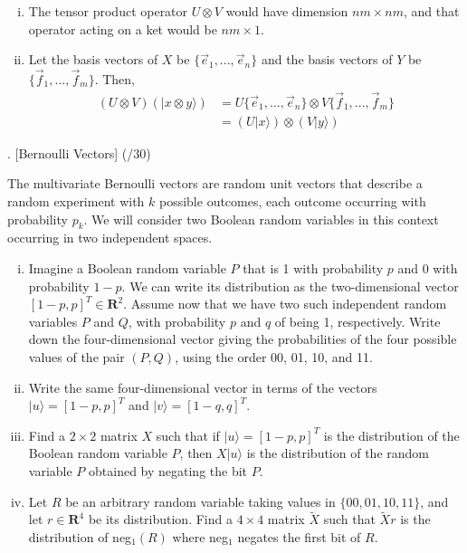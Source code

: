 \documentclass[11pt]{article}
\newenvironment{solution}{\begin{mdframed}[skipabove=\baselineskip,innertopmargin=\baselineskip,innerbottommargin=\baselineskip]
  }{\end{mdframed}}
\begin{document}
\begin{solution}
\begin{enumerate}[(i)]
    \item 
    The tensor product operator $U\otimes V$ would have dimension $nm\times nm$, and that operator acting on a ket would be $nm\times 1$.
    \item  Let the basis vectors of $X$ be $\{\overrightarrow{e}_1,...,\overrightarrow{e}_n\}$ and the basis vectors of $Y$ be $\{\overrightarrow{f}_1,...,\overrightarrow{f}_m\}$. Then, \begin{align*}
        (U\otimes V)(|x \otimes y \rangle) &= U\{\overrightarrow{e}_1,...,\overrightarrow{e}_n\} \otimes V\{\overrightarrow{f}_1,...,\overrightarrow{f}_m\}\\
        &= (U|x\rangle)\otimes(V|y\rangle)
    \end{align*}
\end{enumerate}
\end{solution}

\newpage

 . [Bernoulli Vectors] (/30)
 
The multivariate Bernoulli vectors are random unit vectors that describe a random experiment
with $k$ possible outcomes, each outcome occurring with probability $p_k$. We will consider
two Boolean random variables in this context occurring in two independent spaces.

\begin{enumerate}[(i)]
\item Imagine a Boolean random variable $P$ that is 1 with probability $p$ and 0 with probability $1 - p$. We can write its distribution as the two-dimensional vector $[1 - p, p]^T \in \textbf{R}^2$. Assume now that we have two such independent random variables $P$ and $Q$, with probability $p$ and $q$ of being 1, respectively. Write down the four-dimensional vector giving the probabilities of the four possible values of the pair $(P,Q)$, using the order 00, 01, 10, and 11.

\item Write the same four-dimensional vector in terms of the vectors $|u\rangle = [1-p,p]^T$ and $|v\rangle = [1-q,q]^T$.

\item Find a $2\times2$ matrix $X$ such that if $|u\rangle = [1-p, p]^T$ is the distribution of the Boolean random variable $P$, then $X|u\rangle$ is the distribution of the random variable $P$ obtained by negating the bit $P$.

\item Let $R$ be an arbitrary random variable taking values in $\{00, 01, 10, 11\}$, and let $r \in \textbf{R}^4$ be its distribution. Find a $4\times4$ matrix $\tilde{X}$ such that $\tilde{X}r$ is the distribution of neg$_1(R)$ where neg$_1$ negates the first bit of $R$.

\end{enumerate}
\end{document}
